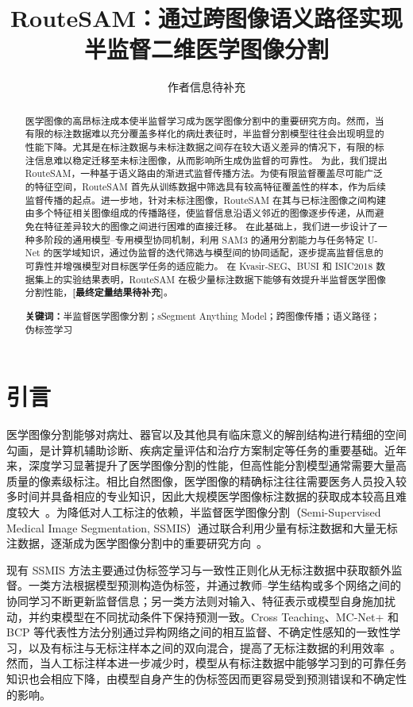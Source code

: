 \documentclass[UTF8,a4paper,10pt]{ctexart}
\title{RouteSAM：通过跨图像语义路径实现半监督二维医学图像分割}
\author{作者信息待补充}
\date{}
\begin{document}
\maketitle

\begin{abstract}
医学图像的高昂标注成本使半监督学习成为医学图像分割中的重要研究方向。然而，当有限的标注数据难以充分覆盖多样化的病灶表征时，半监督分割模型往往会出现明显的性能下降。尤其是在标注数据与未标注数据之间存在较大语义差异的情况下，有限的标注信息难以稳定迁移至未标注图像，从而影响所生成伪监督的可靠性。
为此，我们提出 RouteSAM，一种基于语义路由的渐进式监督传播方法。为使有限监督覆盖尽可能广泛的特征空间，RouteSAM 首先从训练数据中筛选具有较高特征覆盖性的样本，作为后续监督传播的起点。进一步地，针对未标注图像，RouteSAM 在其与已标注图像之间构建由多个特征相关图像组成的传播路径，使监督信息沿语义邻近的图像逐步传递，从而避免在特征差异较大的图像之间进行困难的直接迁移。
在此基础上，我们进一步设计了一种多阶段的通用模型--专用模型协同机制，利用 SAM3 的通用分割能力与任务特定 U-Net 的医学域知识，通过伪监督的迭代筛选与模型间的协同适配，逐步提高监督信息的可靠性并增强模型对目标医学任务的适应能力。
在 Kvasir-SEG、BUSI 和 ISIC2018 数据集上的实验结果表明，RouteSAM 在极少量标注数据下能够有效提升半监督医学图像分割性能，\textbf{[最终定量结果待补充]}。

\noindent\textbf{关键词：}半监督医学图像分割；sSegment Anything Model；跨图像传播；语义路径；伪标签学习
\end{abstract}



\section{引言}

医学图像分割能够对病灶、器官以及其他具有临床意义的解剖结构进行精细的空间勾画，是计算机辅助诊断、疾病定量评估和治疗方案制定等任务的重要基础。近年来，深度学习显著提升了医学图像分割的性能，但高性能分割模型通常需要大量高质量的像素级标注。相比自然图像，医学图像的精确标注往往需要医务人员投入较多时间并具备相应的专业知识，因此大规模医学图像标注数据的获取成本较高且难度较大~\cite{hesamian2019deep,tajbakhsh2020embracing}。为降低对人工标注的依赖，半监督医学图像分割（Semi-Supervised Medical Image Segmentation, SSMIS）通过联合利用少量有标注数据和大量无标注数据，逐渐成为医学图像分割中的重要研究方向~\cite{jiao2024learning}。

现有 SSMIS 方法主要通过伪标签学习与一致性正则化从无标注数据中获取额外监督。一类方法根据模型预测构造伪标签，并通过教师--学生结构或多个网络之间的协同学习不断更新监督信息；另一类方法则对输入、特征表示或模型自身施加扰动，并约束模型在不同扰动条件下保持预测一致。Cross Teaching、MC-Net+ 和 BCP 等代表性方法分别通过异构网络之间的相互监督、不确定性感知的一致性学习，以及有标注与无标注样本之间的双向混合，提高了无标注数据的利用效率~\cite{luo2022crossteaching,wu2022mcnet,bai2023bcp}。然而，当人工标注样本进一步减少时，模型从有标注数据中能够学习到的可靠任务知识也会相应下降，由模型自身产生的伪标签因而更容易受到预测错误和不确定性的影响。
\end{document}
